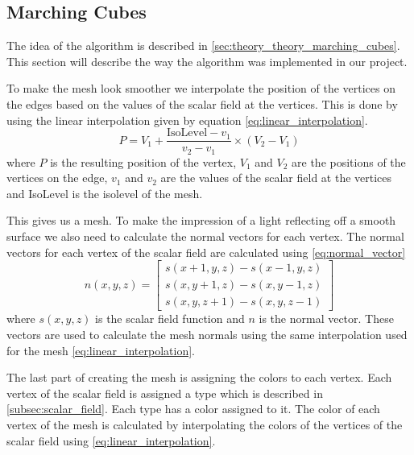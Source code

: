 \subsection{Marching Cubes} \label{subsec:marching_cubes}
The idea of the algorithm is described in \autoref{sec:theory_theory_marching_cubes}.
This section will describe the way the algorithm was implemented in our project.

To make the mesh look smoother we interpolate the position of the vertices on the edges based on the values of the scalar field at the vertices.
This is done by using the linear interpolation given by equation \autoref{eq:linear_interpolation}.
\begin{equation}
  \label{eq:linear_interpolation}
  P = V_1 + \frac{\text{IsoLevel} - v_1}{v_2 - v_1} \times (V_2 - V_1)
\end{equation}
where $P$ is the resulting position of the vertex, $V_1$ and $V_2$ are the positions of the vertices on the edge, $v_1$ and $v_2$ are the values of the scalar field at the vertices and IsoLevel is the isolevel of the mesh.
  
This gives us a mesh.
To make the impression of a light reflecting off a smooth surface we also need to calculate the normal vectors for each vertex.
The normal vectors for each vertex of the scalar field are calculated using \autoref{eq:normal_vector}
\begin{equation}
    \label{eq:normal_vector}
    n(x, y, z) = \begin{bmatrix}
        s(x + 1, y, z) - s(x - 1, y, z) \\
        s(x, y + 1, z) - s(x, y - 1, z) \\
        s(x, y, z + 1) - s(x, y, z - 1)
      \end{bmatrix}
\end{equation}
where $s(x, y, z)$ is the scalar field function and $n$ is the normal vector.
These vectors are used to calculate the mesh normals using the same interpolation used for the mesh \autoref{eq:linear_interpolation}.

The last part of creating the mesh is assigning the colors to each vertex.
Each vertex of the scalar field is assigned a type which is described in \autoref{subsec:scalar_field}.
Each type has a color assigned to it.
The color of each vertex of the mesh is calculated by interpolating the colors of the vertices of the scalar field using \autoref{eq:linear_interpolation}.

